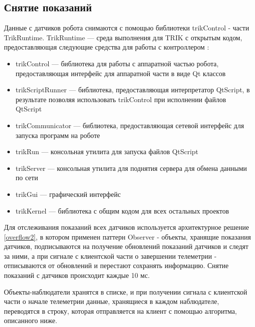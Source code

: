 \documentclass[conference]{IEEEtran}
\begin{document}
\subsection{Снятие показаний}
Данные с датчиков робота снимаются с помощью библиотеки trikControl - части TrikRuntime. TrikRuntime \cite{trikruntime} --- среда выполнения для TRIK с открытым кодом, предоставляющая следующие средства для работы с контроллером : 
\begin{itemize}
\item trikControl --- библиотека для работы с аппаратной частью робота, предоставляющая интерфейс для аппаратной части в виде Qt классов
\item trikScriptRunner --- библиотека, предоставляющая интерпретатор QtScript, в результате позволяя использовать trikControl при исполнении файлов QtScript
\item trikCommunicator --- библиотека, предоставляющая сетевой интерфейс для запуска программ на роботе
\item trikRun --- консольная утилита для запуска файлов \cite{qtscript} QtScript
\item trikServer --- консольная утилита для поднятия сервера для обмена данными по сети
\item trikGui --- графический интерфейс
\item trikKernel --- библиотека с общим кодом для всех остальных проектов
\end{itemize} 
Для отслеживания показаний всех датчиков используется архитектурное решение \ref{overflow2}, в котором применен паттерн Observer - объекты, хранящие показания датчиков, подписываются на получение обновлений показаний датчиков и следят за ними, а при сигнале с клиентской части о завершении телеметрии - отписываются от обновлений и перестают сохранять информацию. Снятие показаний с датчиков происходит каждые 10 мс.


Объекты-наблюдатели хранятся в списке, и при получении сигнала с клиентской части о начале телеметрии данные, хранящиеся в каждом наблюдателе, переводятся в строку, которая отправляется на клиент с помощью алгоритма, описанного ниже.
\end{document}
